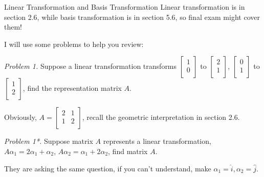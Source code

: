 \documentclass{beamer}
\begin{document}
\begin{frame}{Linear Transformation and Basis Transformation}
Linear transformation is in section 2.6, while basis transformation is in section 5.6, so final exam might cover them!

\vspace{3pt}
I will use some problems to help you review:

\vspace{3pt}
\emph{Problem 1.} Suppose a linear transformation transforms $\left[ \begin{array}{c}
        1\\
        0\\
    \end{array} \right]$ to $\left[ \begin{array}{c}
        2\\
        1\\
    \end{array} \right]$, $\left[ \begin{array}{c}
        0\\
        1\\
    \end{array} \right]$ to $\left[ \begin{array}{c}
        1\\
        2\\
    \end{array} \right]$, find the representation matrix $A$.

Obviously, $A=\left[ \begin{matrix}
	2&		1\\
	1&		2\\
\end{matrix} \right]$, recall the geometric interpretation in section 2.6.

\vspace{3pt}
\emph{Problem 1*.} Suppose matrix $A$ represents a linear transformation, $A\alpha_1=2\alpha_1+\alpha_2$, $A\alpha_2=\alpha_1+2\alpha_2$, find matrix $A$.

\vspace{3pt}
They are asking the same question, if you can't understand, make $\alpha_1=\hat{i}, \alpha_2=\hat{j}$.
\end{frame}
\end{document}
